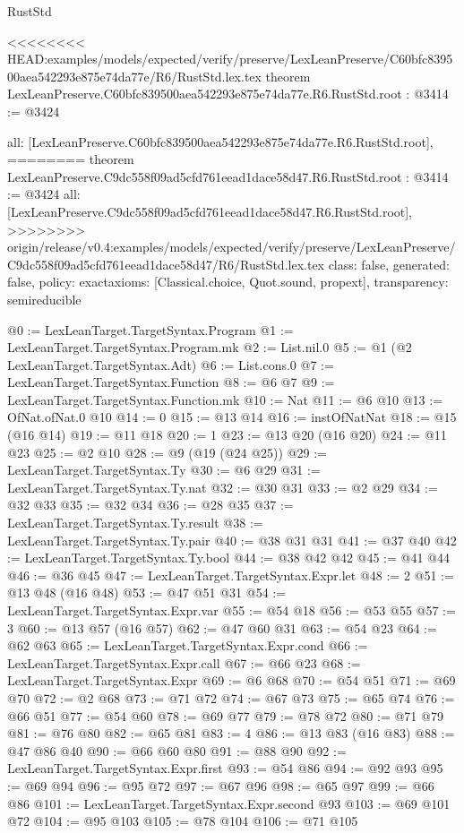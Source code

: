 \begin{lexlean}{RustStd}
\begin{coremodule}
{\begin{coremodule}
{{{{{{{{{{}
<<<<<<<< HEAD:examples/models/expected/verify/preserve/LexLeanPreserve/C60bfc839500aea542293e875e74da77e/R6/RustStd.lex.tex
theorem LexLeanPreserve.C60bfc839500aea542293e875e74da77e.R6.RustStd.root : @3414 := @3424 {
  all: [LexLeanPreserve.C60bfc839500aea542293e875e74da77e.R6.RustStd.root],
========
theorem LexLeanPreserve.C9dc558f09ad5cfd761eead1dace58d47.R6.RustStd.root : @3414 := @3424 {
  all: [LexLeanPreserve.C9dc558f09ad5cfd761eead1dace58d47.R6.RustStd.root],
>>>>>>>> origin/release/v0.4:examples/models/expected/verify/preserve/LexLeanPreserve/C9dc558f09ad5cfd761eead1dace58d47/R6/RustStd.lex.tex
  class: false,
  generated: false,
  policy: exact{axioms: [Classical.choice, Quot.sound, propext]},
  transparency: semireducible
}

@0 := LexLeanTarget.TargetSyntax.Program
@1 := LexLeanTarget.TargetSyntax.Program.mk
@2 := List.nil.{0}
@5 := @1 (@2 LexLeanTarget.TargetSyntax.Adt)
@6 := List.cons.{0}
@7 := LexLeanTarget.TargetSyntax.Function
@8 := @6 @7
@9 := LexLeanTarget.TargetSyntax.Function.mk
@10 := Nat
@11 := @6 @10
@13 := OfNat.ofNat.{0} @10
@14 := 0
@15 := @13 @14
@16 := instOfNatNat
@18 := @15 (@16 @14)
@19 := @11 @18
@20 := 1
@23 := @13 @20 (@16 @20)
@24 := @11 @23
@25 := @2 @10
@28 := @9 (@19 (@24 @25))
@29 := LexLeanTarget.TargetSyntax.Ty
@30 := @6 @29
@31 := LexLeanTarget.TargetSyntax.Ty.nat
@32 := @30 @31
@33 := @2 @29
@34 := @32 @33
@35 := @32 @34
@36 := @28 @35
@37 := LexLeanTarget.TargetSyntax.Ty.result
@38 := LexLeanTarget.TargetSyntax.Ty.pair
@40 := @38 @31 @31
@41 := @37 @40
@42 := LexLeanTarget.TargetSyntax.Ty.bool
@44 := @38 @42 @42
@45 := @41 @44
@46 := @36 @45
@47 := LexLeanTarget.TargetSyntax.Expr.let
@48 := 2
@51 := @13 @48 (@16 @48)
@53 := @47 @51 @31
@54 := LexLeanTarget.TargetSyntax.Expr.var
@55 := @54 @18
@56 := @53 @55
@57 := 3
@60 := @13 @57 (@16 @57)
@62 := @47 @60 @31
@63 := @54 @23
@64 := @62 @63
@65 := LexLeanTarget.TargetSyntax.Expr.cond
@66 := LexLeanTarget.TargetSyntax.Expr.call
@67 := @66 @23
@68 := LexLeanTarget.TargetSyntax.Expr
@69 := @6 @68
@70 := @54 @51
@71 := @69 @70
@72 := @2 @68
@73 := @71 @72
@74 := @67 @73
@75 := @65 @74
@76 := @66 @51
@77 := @54 @60
@78 := @69 @77
@79 := @78 @72
@80 := @71 @79
@81 := @76 @80
@82 := @65 @81
@83 := 4
@86 := @13 @83 (@16 @83)
@88 := @47 @86 @40
@90 := @66 @60 @80
@91 := @88 @90
@92 := LexLeanTarget.TargetSyntax.Expr.first
@93 := @54 @86
@94 := @92 @93
@95 := @69 @94
@96 := @95 @72
@97 := @67 @96
@98 := @65 @97
@99 := @66 @86
@101 := LexLeanTarget.TargetSyntax.Expr.second @93
@103 := @69 @101 @72
@104 := @95 @103
@105 := @78 @104
@106 := @71 @105
}}}}}}}}}}
\end{coremodule}}
\end{coremodule}
\end{lexlean}
